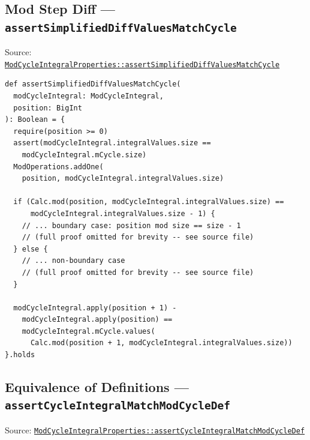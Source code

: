 \subsection{Mod Step Diff --- \texorpdfstring{\texttt{assert\allowbreak Simplified\allowbreak Diff\allowbreak Values\allowbreak Match\allowbreak Cycle}}{assertSimplifiedDiffValuesMatchCycle}}

{\raggedright Source: \href{https://github.com/thiagomata/prime-numbers/blob/integral-cycle-article-v1.0.0/src/main/scala/v1/chapter4/cycle/integral/mod/ModCycleIntegralProperties.scala}{\texttt{Mod\allowbreak Cycle\allowbreak Integral\allowbreak Properties::assert\allowbreak Simplified\allowbreak Diff\allowbreak Values\allowbreak Match\allowbreak Cycle}}\par}

\begin{lstlisting}[style=scala]
def assertSimplifiedDiffValuesMatchCycle(
  modCycleIntegral: ModCycleIntegral,
  position: BigInt
): Boolean = {
  require(position >= 0)
  assert(modCycleIntegral.integralValues.size ==
    modCycleIntegral.mCycle.size)
  ModOperations.addOne(
    position, modCycleIntegral.integralValues.size)

  if (Calc.mod(position, modCycleIntegral.integralValues.size) ==
      modCycleIntegral.integralValues.size - 1) {
    // ... boundary case: position mod size == size - 1
    // (full proof omitted for brevity -- see source file)
  } else {
    // ... non-boundary case
    // (full proof omitted for brevity -- see source file)
  }

  modCycleIntegral.apply(position + 1) -
    modCycleIntegral.apply(position) ==
    modCycleIntegral.mCycle.values(
      Calc.mod(position + 1, modCycleIntegral.integralValues.size))
}.holds
\end{lstlisting}

\subsection{Equivalence of Definitions --- \texorpdfstring{\texttt{assert\allowbreak Cycle\allowbreak Integral\allowbreak Match\allowbreak Mod\allowbreak Cycle\allowbreak Def}}{assertCycleIntegralMatchModCycleDef}}

{\raggedright Source: \href{https://github.com/thiagomata/prime-numbers/blob/integral-cycle-article-v1.0.0/src/main/scala/v1/chapter4/cycle/integral/mod/ModCycleIntegralProperties.scala}{\texttt{Mod\allowbreak Cycle\allowbreak Integral\allowbreak Properties::assert\allowbreak Cycle\allowbreak Integral\allowbreak Match\allowbreak Mod\allowbreak Cycle\allowbreak Def}}\par}

